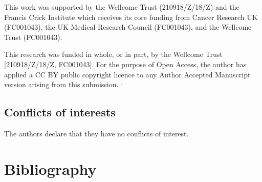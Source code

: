 \documentclass[twocolumn]{bioRxiv}
\begin{document}
This work was supported by the Wellcome Trust (210918/Z/18/Z) and the Francis Crick Institute which receives its core funding from Cancer Research UK (FC001043), the UK Medical Research Council (FC001043), and the Wellcome Trust (FC001043).

This research was funded in whole, or in part, by the Wellcome Trust [210918/Z/18/Z, FC001043]. For the purpose of Open Access, the author has applied a CC BY public copyright licence to any Author Accepted Manuscript version arising from this submission.·


\subsection*{Conflicts of interests}
The authors declare that they have no conflicts of interest.



\section*{Bibliography}




\end{document}
